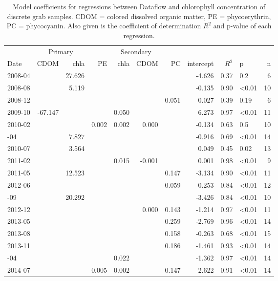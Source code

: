 \begin{table}

\caption{\label{tab:}Model coefficients for regressions between Dataflow and chlorophyll concentration of discrete grab samples. CDOM = colored dissolved organic matter, PE = phycoerythrin, PC = phycocyanin. Also given is the coefficient of determination $R^2$ and p-value of each regression.}
\centering
\begin{tabular}[t]{lrrrrrrrrlr}
\toprule
\multicolumn{1}{c}{ } & \multicolumn{2}{c}{Primary} & \multicolumn{4}{c}{Secondary} \\ \cmidrule(l{2pt}r{2pt}){2-3} \cmidrule(l{2pt}r{2pt}){4-7}
Date & CDOM & chla & PE & chla & CDOM & PC & intercept & $R^2$ & p & n\\
\midrule
2008-04 &  & 27.626 &  &  &  &  & -4.626 & 0.37 & 0.2 & 6\\
2008-08 &  & 5.119 &  &  &  &  & -0.135 & 0.90 & \textless0.01 & 10\\
2008-12 &  &  &  &  &  & 0.051 & 0.027 & 0.39 & 0.19 & 6\\
2009-10 & -67.147 &  &  & 0.050 &  &  & 6.273 & 0.97 & \textless0.01 & 11\\
2010-02 &  &  & 0.002 & 0.002 & 0.000 &  & -0.134 & 0.63 & 0.5 & 10\\
\addlinespace
2010-04 &  & 7.827 &  &  &  &  & -0.916 & 0.69 & \textless0.01 & 14\\
2010-07 &  & 3.564 &  &  &  &  & 0.049 & 0.45 & 0.02 & 13\\
2011-02 &  &  &  & 0.015 & -0.001 &  & 0.001 & 0.98 & \textless0.01 & 9\\
2011-05 &  & 12.523 &  &  &  & 0.147 & -3.134 & 0.90 & \textless0.01 & 11\\
2012-06 &  &  &  &  &  & 0.059 & 0.253 & 0.84 & \textless0.01 & 12\\
\addlinespace
2012-09 &  & 20.292 &  &  &  &  & -3.426 & 0.84 & \textless0.01 & 10\\
2012-12 &  &  &  &  & 0.000 & 0.143 & -1.214 & 0.97 & \textless0.01 & 11\\
2013-05 &  &  &  &  &  & 0.259 & -2.769 & 0.96 & \textless0.01 & 14\\
2013-08 &  &  &  &  &  & 0.158 & -0.263 & 0.68 & \textless0.01 & 15\\
2013-11 &  &  &  &  &  & 0.186 & -1.461 & 0.93 & \textless0.01 & 14\\
\addlinespace
2014-04 &  &  &  & 0.022 &  &  & -1.362 & 0.97 & \textless0.01 & 14\\
2014-07 &  &  & 0.005 & 0.002 &  & 0.147 & -2.622 & 0.91 & \textless0.01 & 14\\

\end{tabular}
\end{table}
